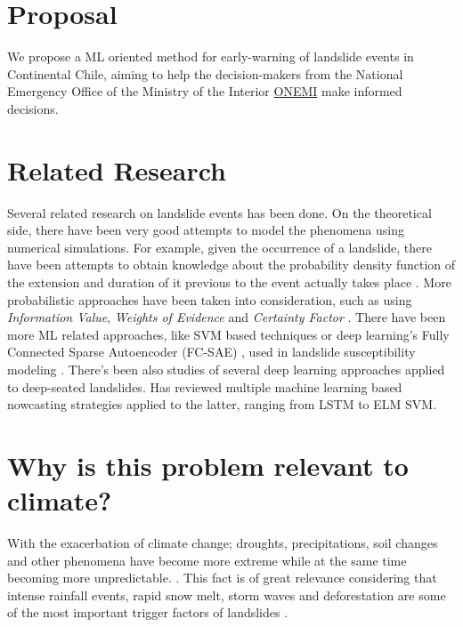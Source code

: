 \documentclass[sigconf, nonacm]{acmart}
\begin{document}
\section{Proposal}

We propose a ML oriented method for early-warning of landslide events in Continental Chile, aiming to help the decision-makers from the National Emergency Office of the Ministry of the Interior \href{https://www.onemi.gov.cl/}{ONEMI} make informed decisions.


\section{Related Research}


Several related research on landslide events has been done. 
On the theoretical side, there have been very good attempts to model the phenomena using numerical simulations. For example, given the occurrence of a landslide, there have been attempts to obtain knowledge about the probability density function of the extension and duration of it previous to the event actually takes place \cite{characteristic_scales}. 
More probabilistic approaches have been taken into consideration, such as using \emph{Information Value}, \emph{Weights of Evidence} and \emph{Certainty Factor} \cite{predictivelandslide}. There have been more ML related approaches, like SVM based techniques or deep learning's Fully Connected Sparse Autoencoder (FC-SAE) \cite{fcsae}, used in landslide susceptibility modeling \cite{svmlandslide}. There's been also studies of several deep learning approaches applied to deep-seated landslides. \cite{deep_seated_implementations} Has reviewed multiple machine learning based nowcasting strategies applied to the latter, ranging from LSTM to ELM SVM.
\section{Why is this problem relevant to climate?}

With the exacerbation of climate change; droughts, precipitations, soil changes and other phenomena have become more extreme while at the same time becoming more unpredictable. \cite{climatechangeimpacts}. 
This fact is of great relevance considering that intense rainfall events, rapid snow melt, storm waves and deforestation are some of the most important trigger factors of landslides \cite{libro_geologia}.
\end{document}
